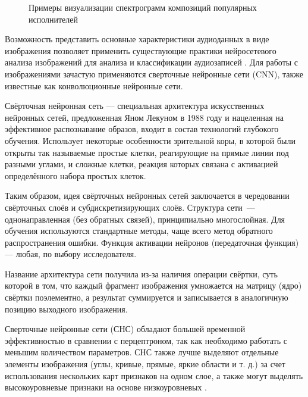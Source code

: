 \begin{figure}[H]
	\caption{Примеры визуализации спектрограмм композиций популярных исполнителей}
	\label{fig:spec}
\end{figure}

Возможность представить основные характеристики аудиоданных в виде изображения позволяет применить существующие практики
нейросетевого анализа изображений для анализа и классификации аудиозаписей \cite{cyber_alex}.
Для работы с изображениями зачастую применяются сверточные нейронные сети (CNN), также известные как конволюционные нейронные сети.

Свёрточная нейронная сеть — специальная архитектура искусственных нейронных сетей, предложенная Яном Лекуном в 1988 году и нацеленная на эффективное распознавание образов, входит в состав технологий глубокого обучения. 
Использует некоторые особенности зрительной коры, в которой были открыты так называемые простые клетки, реагирующие на прямые линии под разными углами, и сложные клетки, реакция которых связана с активацией определённого набора простых клеток. 

Таким образом, идея свёрточных нейронных сетей заключается в чередовании свёрточных слоёв и субдискретизирующих слоёв. Структура сети — однонаправленная (без обратных связей), принципиально многослойная. Для обучения используются стандартные методы, чаще всего метод обратного распространения ошибки. Функция активации нейронов (передаточная функция) — любая, по выбору исследователя.

Название архитектура сети получила из-за наличия операции свёртки, суть которой в том, что каждый фрагмент изображения умножается на матрицу (ядро) свёртки поэлементно, а результат суммируется и записывается в аналогичную позицию выходного изображения. 

Сверточные нейронные сети (СНС) обладают большей временной эффективностью в сравнении с перцептроном, так как необходимо
работать с меньшим количеством параметров. СНС также лучше выделяют отдельные элементы изображения (углы,
кривые, прямые, яркие области и т. д.) за счет использования нескольких карт признаков на одном слое, а также могут 
выделять высокоуровневые признаки на основе низкоуровневых \cite{cyberbred}.

